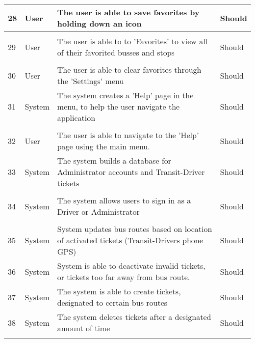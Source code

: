 \documentclass[a4paper,12pt]{article}
\begin{document}
\begin{tabular}{p{0.4cm}|p{2cm}|p{8cm}|p{1.7cm}}

28 & User & The user is able to save favorites by holding down an icon & Should \\
\hline\\
29 & User & The user is able to to 'Favorites' to view all of their favorited busses and stops & Should \\
\hline\\
30 & User & The user is able to clear favorites through the 'Settings' menu & Should \\
\hline
31 & System & The system creates a 'Help' page in the menu, to help the user navigate the application & Should \\
\hline\\
32 & User & The user is able to navigate to the 'Help' page using the main menu. & Should \\
\hline
33 & System & The system builds a database for Administrator accounts and Transit-Driver tickets & Should \\
\hline\\
34 & System & The system allows users to sign in as a Driver or Administrator & Should \\
\hline\\
35 & System & System updates bus routes based on location of activated tickets (Transit-Drivers phone GPS) & Should \\
\hline
36 & System & System is able to deactivate invalid tickets, or tickets too far away from bus route. & Should\\
\hline
37 & System & The system is able to create tickets, designated to certain bus routes & Should \\
\hline
38 & System & The system deletes tickets after a designated amount of time & Should \\
\hline\\

\end{tabular}

\pagebreak
\end{document}
